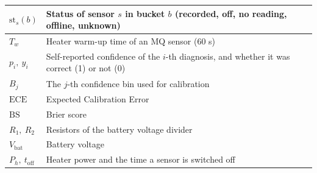 \begin{singlespace}
\begin{longtable}{|P{2.6cm}|P{10.8cm}|}
$\mathrm{st}_s(b)$ & Status of sensor $s$ in bucket $b$ (recorded, off, no reading, offline, unknown)\\\hline
$T_w$ & Heater warm-up time of an MQ sensor (60 s)\\\hline
$p_i,\ y_i$ & Self-reported confidence of the $i$-th diagnosis, and whether it was correct (1) or not (0)\\\hline
$B_j$ & The $j$-th confidence bin used for calibration\\\hline
$\mathrm{ECE}$ & Expected Calibration Error\\\hline
$\mathrm{BS}$ & Brier score\\\hline
$R_1,\ R_2$ & Resistors of the battery voltage divider\\\hline
$V_{\mathrm{bat}}$ & Battery voltage\\\hline
$P_h,\ t_{\mathrm{off}}$ & Heater power and the time a sensor is switched off\\\hline
\end{longtable}
\end{singlespace}
